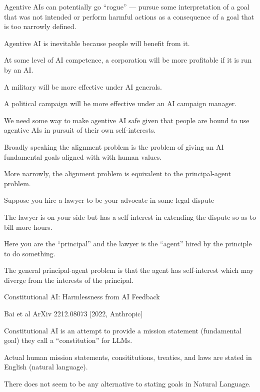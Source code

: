 {\vfill
Agentive AIs can potentially go ``rogue'' --- pursue some interpretation of a goal that was not intended or perform harmful actions as a consequence of a goal that is too narrowly defined.


Agentive AI is inevitable because people will benefit from it.

\vfill
At some level of AI competence, a corporation will be more profitable if it is run by an AI.

\vfill
A military will be more effective under AI generals.

\vfill
A political campaign will be more effective under an AI campaign manager.

\vfill
We need some way to make agentive AI safe given that people are bound to use agentive AIs in pursuit of their own self-interests.


Broadly speaking the alignment problem is the problem of giving an AI fundamental goals aligned with with human values.

\vfill
More narrowly, the alignment problem is equivalent to the principal-agent problem.


Suppose you hire a lawyer to be your advocate in some legal dispute

\vfill
The lawyer is on your side but has a self interest in extending the dispute so as to bill more hours.

\vfill
Here you are the ``principal'' and the lawyer is the ``agent'' hired by the principle to do something.

\vfill
The general principal-agent problem is that the agent has self-interest which may diverge from the interests of the principal.


\centerline{\huge Constitutional AI: Harmlessness from AI Feedback}
\centerline{\huge Bai et al ArXiv 2212.08073 [2022, Anthropic]}

\vfill
Constitutional AI is an attempt to provide a mission  statement (fundamental goal) they call a ``constitution'' for LLMs.

\vfill
Actual human mission statements, consititutions, treaties, and laws are stated in English (natural language).

\vfil
There does not seem to be any alternative to stating goals in Natural Language.

}
